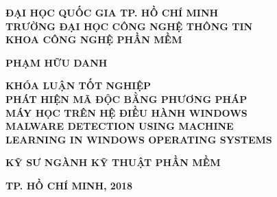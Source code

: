 %
\begin{titlepage}


\thisfancypage{
\setlength{\fboxrule}{2pt}
\setlength{\fboxsep}{15pt}
\doublebox
}{}

\begin{center}
  
\textbf{\large {ĐẠI HỌC QUỐC GIA TP. HỒ CHÍ MINH}} \\
[2mm]
\textbf{\Large {TRƯỜNG ĐẠI HỌC CÔNG NGHỆ THÔNG TIN}} \\ 
[2mm]
\textbf{\Large {KHOA CÔNG NGHỆ PHẦN MỀM}}

\vspace{0.1\textheight}
\textbf{\large PHẠM HỮU DANH}

\vspace{0.1\textheight}
\textbf{\Large KHÓA LUẬN TỐT NGHIỆP} \\ [10mm]

\textbf{\Large PHÁT HIỆN MÃ ĐỘC BẰNG PHƯƠNG PHÁP } \\ 
[2mm]
\textbf{\Large MÁY HỌC TRÊN HỆ ĐIỀU HÀNH WINDOWS } \\ 
[10mm]
\textbf{ \Large MALWARE DETECTION USING MACHINE } \\ 
[2mm]
\textbf{ \Large LEARNING IN WINDOWS OPERATING SYSTEMS }

\vspace{0.15\textheight}
\textbf{\large KỸ SƯ NGÀNH KỸ THUẬT PHẦN MỀM}

\vspace{\fill}
\textbf{\large TP. HỒ CHÍ MINH, 2018}
\end{center}

\end{titlepage}
\cleardoublepage

